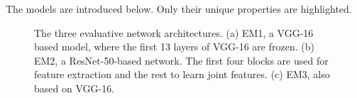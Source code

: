 The models are introduced below. Only their unique properties are highlighted.

\begin{figure}[t!]
\centering


\caption{The three evaluative network architectures. (a) EM1, a VGG-16 based model, where the first 13 layers of VGG-16 are frozen. (b) EM2, a ResNet-50-based network. The first four blocks are used for feature extraction and the rest to learn joint features. (c) EM3, also based on VGG-16.}
\label{fig:networkArchitecture2}
\end{figure}

